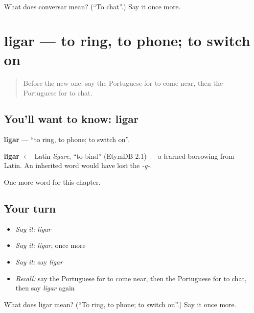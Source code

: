 \begin{tcolorbox}[breakable,colback=teal!4,colframe=teal!35!black,title={Before you move on}]
What does conversar mean? (\textquotedblleft{}To chat\textquotedblright{}.) Say it once more.
\end{tcolorbox}
\section[ligar]{ligar — to ring, to phone; to switch on}

\label{lesson:PT-C207-ligar}



\begin{quote}
Before the new one: say the Portuguese for to come near, then the Portuguese for to chat.
\end{quote}

\subsection*{You'll want to know: ligar}
\textbf{ligar} — \textquotedblleft{}to ring, to phone; to switch on\textquotedblright{}.

\begin{cousinweb}
\textbf{ligar} $\leftarrow$ Latin \emph{ligare}, \textquotedblleft{}to bind\textquotedblright{} (EtymDB 2.1) — a learned borrowing from Latin. An inherited word would have lost the \emph{-g-}.
\end{cousinweb}

\begin{grammarlens}[title={What you've built}]
One more word for this chapter.
\end{grammarlens}

\subsection*{Your turn}
\begin{itemize}
\raggedright
  \item \emph{Say it:} \emph{ligar}
  \item \emph{Say it:} \emph{ligar}, once more
  \item \emph{Say it:} say \emph{ligar}
  \item \emph{Recall:} say the Portuguese for to come near, then the Portuguese for to chat, then say \emph{ligar} again
\end{itemize}

\begin{tcolorbox}[breakable,colback=teal!4,colframe=teal!35!black,title={Before you move on}]
What does ligar mean? (\textquotedblleft{}To ring, to phone; to switch on\textquotedblright{}.) Say it once more.
\end{tcolorbox}
